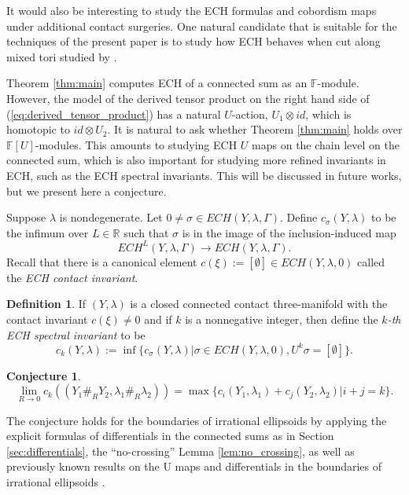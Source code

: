 \documentclass{article}
\numberwithin{equation}{section}
\newtheorem{conjecture}[theorem]{Conjecture}
\theoremstyle{definition}
\newtheorem{definition}[theorem]{Definition}
\newcommand{\R}{\mathbb{R}}
\newcommand{\F}{\mathbb{F}}
\begin{document}
It would also be interesting to study the ECH formulas and cobordism maps under additional contact surgeries. One natural candidate that is suitable for the techniques of the present paper is to study how ECH behaves when cut along mixed tori studied by \cite{Menke_JSJ_mixed_torus}.  

Theorem \ref{thm:main} computes ECH of a connected sum as an $\F$-module. However, the model of the derived tensor product on the right hand side of (\ref{eq:derived_tensor_product}) has a natural $U$-action, $U_1 \otimes id$, which is homotopic to $id \otimes U_2$. It is natural to ask whether Theorem \ref{thm:main} holds over $\F[U]$-modules. This amounts to studying ECH $U$ maps on the chain level on the connected sum, which is also important for studying more refined invariants in ECH, such as the ECH spectral invariants. This will be discussed in future works, but we present here a conjecture.

Suppose $\lambda$ is nondegenerate. Let $0\neq \sigma\in ECH(Y,\lambda, \Gamma)$. Define $c_\sigma(Y,\lambda)$ to be the infimum over $L\in \R$ such that $\sigma$ is in the image of the inclusion-induced map 
$$ECH^L(Y,\lambda, \Gamma) \longrightarrow ECH(Y,\lambda, \Gamma).$$ 
Recall that there is a canonical element $c(\xi):=[\emptyset]\in ECH(Y, \lambda, 0)$ called the \emph{ECH contact invariant}.

\begin{definition}
If $(Y,\lambda)$ is a closed connected contact three-manifold with the contact invariant $c(\xi) \neq 0$ and if $k$ is a nonnegative integer, then define the \emph{$k$-th ECH spectral invariant} to be
$$c_k(Y,\lambda):= \inf\{c_\sigma(Y,\lambda)|\sigma\in ECH(Y, \lambda, 0), U^k\sigma = [\emptyset]\}.$$
\end{definition}

\begin{conjecture}
\label{conj:ECH_spectrum_connected_sum}
$$\lim_{R\to 0}c_k((Y_1\#_{R}Y_2, \lambda_1 \#_{R} \lambda_2)) = \max\{c_i(Y_1, \lambda_1)+c_j(Y_2, \lambda_2)|i+j = k\}.$$
\end{conjecture}
The conjecture holds for the boundaries of irrational ellipsoids by applying the explicit formulas of differentials in the connected sums as in Section \ref{sec:differentials}, the ``no-crossing'' Lemma \ref{lem:no_crossing}, as well as previously known results on the U maps and differentials in the boundaries of irrational ellipsoids \cite{quantitative_ECH}.
\end{document}
